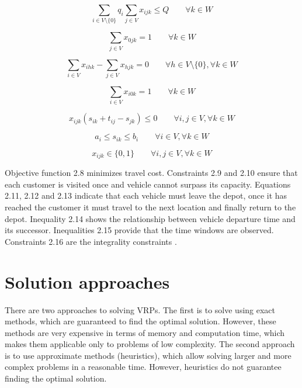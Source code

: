 \documentclass[a4paper,twoside,12pt]{book}
\begin{document}
\begin{equation}
\sum_{i \in V \setminus \lbrace 0 \rbrace}q_{i} \sum_{j \in V}x_{ijk} \leq Q \qquad \forall k \in W
\end{equation}

\begin{equation}
\sum_{j \in V}x_{0jk} = 1 \qquad \forall k \in W
\end{equation}

\begin{equation}
\sum_{i \in V}x_{ihk} -\sum_{j \in V}x_{hjk} = 0 \qquad \forall h \in V \setminus \lbrace 0 \rbrace, \forall k \in W
\end{equation}

\begin{equation}
\sum_{i \in V}x_{i0k} = 1 \qquad \forall k \in W
\end{equation}

\begin{equation}
x_{ijk}(s_{ik}+t_{ij}-s_{jk}) \leq 0 \qquad \forall i,j \in V ,\forall k \in W
\end{equation}

\begin{equation}
a_{i}\leq s_{ik} \leq b_{i} \qquad \forall i \in V ,\forall k \in W
\end{equation}

\begin{equation}
x_{ijk} \in \lbrace 0,1 \rbrace \qquad \forall i,j \in V ,\forall k \in W
\end{equation}

Objective function 2.8 minimizes travel cost. Constraints 2.9 and 2.10 ensure that each customer is visited once and vehicle cannot surpass its capacity. Equations 2.11, 2.12 and 2.13 indicate that each vehicle must leave the depot, once it has reached the customer it must travel to the next location and finally return to the depot. Inequality 2.14 shows the relationship between vehicle departure time and its successor. Inequalities 2.15 provide that the time windows are observed. Constraints 2.16 are the integrality constraints \cite{bib:chapter:VRPTW}.

\section{Solution approaches}

There are two approaches to solving VRPs. The first is to solve using exact methods, which are guaranteed to find the optimal solution. However, these methods are very expensive in terms of memory and computation time, which makes them applicable only to problems of low complexity. The second approach is to use approximate methods (heuristics), which allow solving larger and more complex problems in a reasonable time. However, heuristics do not guarantee finding the optimal solution. 
\end{document}
